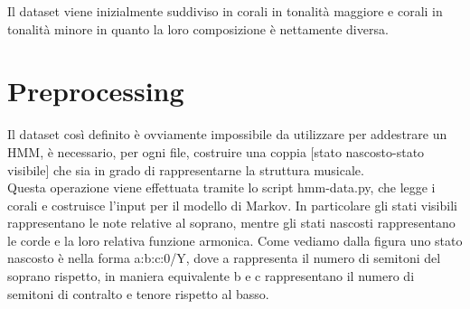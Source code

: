 Il dataset viene inizialmente suddiviso in corali in tonalità maggiore e corali in tonalità minore in quanto la loro composizione è nettamente diversa.

\section{Preprocessing}
Il dataset così definito è ovviamente impossibile da utilizzare per addestrare un HMM, è necessario, per ogni file, costruire una coppia [stato nascosto-stato visibile] che sia in grado di rappresentarne la struttura musicale. \\
Questa operazione viene effettuata tramite lo script hmm-data.py, che legge i corali e costruisce l'input per il modello di Markov.
In particolare gli stati visibili rappresentano le note relative al soprano, mentre gli stati nascosti rappresentano le corde e la loro relativa funzione armonica.
Come vediamo dalla figura uno stato nascosto è nella forma a:b:c:0/Y, dove a rappresenta il numero di semitoni del soprano rispetto, in maniera equivalente b e c rappresentano il numero di semitoni di contralto e tenore rispetto al basso.

